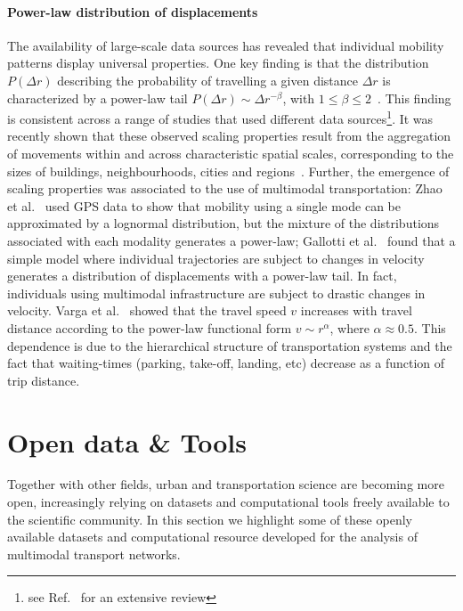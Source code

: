 \paragraph{Power-law distribution of displacements} 
The availability of large-scale data sources has revealed that individual mobility patterns display universal properties. One key finding is that the distribution $P(\Delta r)$ describing the probability of travelling a given distance $\Delta r$ is characterized by a power-law tail $P(\Delta r)\sim \Delta r ^{-\beta}$, with $1 \leq \beta \leq 2$~\cite{gonzalez2008understanding,barbosa2018human}. This finding is consistent across a range of studies that used different data sources\footnote{see Ref.~\cite{alessandretti2017multi} for an extensive review}. It was recently shown that these observed scaling properties result from the aggregation of movements within and across characteristic spatial scales, corresponding to the sizes of buildings, neighbourhoods, cities and regions~\cite{alessandretti2020scales}. Further, the emergence of scaling properties was associated to the use of multimodal transportation: Zhao et al.~\cite{zhao2015explaining} used GPS data to show that mobility using a single mode can be approximated by a lognormal distribution, but the mixture of the distributions associated with each modality generates a power-law; Gallotti et al.~\cite{gallotti2016stochastic} found that a simple model where individual trajectories are subject to changes in velocity generates a distribution of displacements with a power-law tail. In fact, individuals using multimodal infrastructure are subject to drastic changes in velocity. Varga et al.~\cite{varga2016further} showed that the travel speed $v$ increases with travel distance according to the power-law functional form $v \sim r ^\alpha$, where $\alpha \approx 0.5$. This dependence is due to the hierarchical structure of transportation systems and the fact that waiting-times (parking, take-off, landing, etc) decrease as a function of trip distance. 


\section{Open data \& Tools \label{sec:datatools}}

Together with other fields, urban and transportation science are becoming more open, increasingly relying on datasets and computational tools freely available to the scientific community. In this section we highlight some of these openly available datasets and computational resource developed for the analysis of multimodal transport networks.

